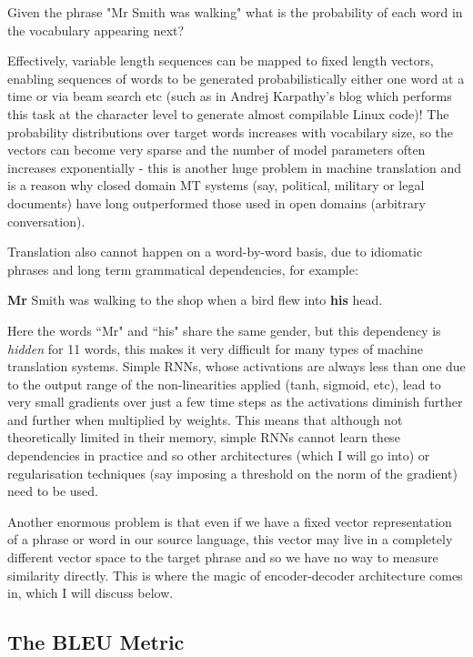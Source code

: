 \documentclass[]{article}
\begin{document}
Given the phrase "Mr Smith was walking" what is the probability
of each word in the vocabulary appearing next?

Effectively, variable length sequences can be mapped to fixed length vectors, enabling sequences of words to be generated probabilistically either one word at a time or via beam search etc (such as in Andrej Karpathy's blog which performs this task at the character level to generate almost compilable Linux code)! The probability distributions over target words increases with vocabilary size, so the vectors can become very sparse and the number of model parameters often increases exponentially - this is another huge problem in machine translation and is a reason why closed domain MT systems (say, political, military or legal documents) have long outperformed those used in open domains (arbitrary conversation). 

Translation also cannot happen on a word-by-word basis, due to idiomatic phrases and long term grammatical dependencies, for example:

{\centering
\textbf{Mr} Smith was walking to the shop when a bird flew into \textbf{his} head. \par
}


Here the words ``Mr" and ``his" share the same gender, but this dependency is \textit{hidden} for 11 words, this makes it very difficult for many types of machine translation systems. Simple RNNs, whose activations are always less than one due to the output range of the non-linearities applied (tanh, sigmoid, etc), lead to very small gradients over just a few time steps as the activations diminish further and further when multiplied by weights. This means that although not theoretically limited in their memory, simple RNNs cannot learn these dependencies in practice and so other architectures (which I will go into) or regularisation techniques (say imposing a threshold on the norm of the gradient) need to be used. 

Another enormous problem is that even if we have a fixed vector representation of a phrase or word in our source language, this vector may live in a completely different vector space to the target phrase and so we have no way to measure similarity directly. This is where the magic of encoder-decoder architecture comes in, which I will discuss below.


\subsection{The BLEU Metric}
\end{document}

